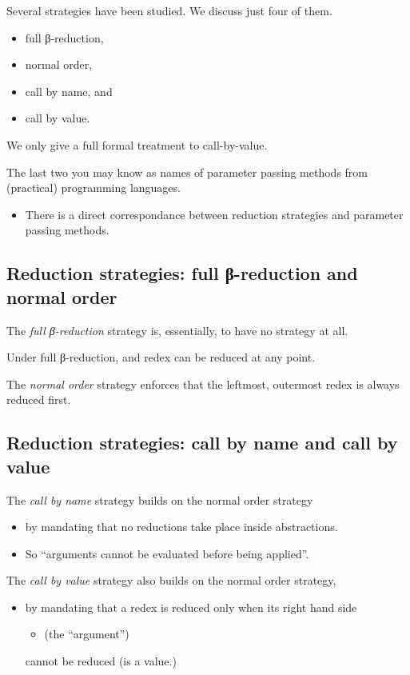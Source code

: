 \documentclass[11pt]{article}
\theoremstyle{definition}
\begin{document}
Several strategies have been studied. We discuss just four of them.
\begin{itemize}
\item full β-reduction,
\item normal order,
\item call by name, and
\item call by value.
\end{itemize}
We only give a full formal treatment to call-by-value.

The last two you may know as names of parameter passing methods
from (practical) programming languages.
\begin{itemize}
\item There is a direct correspondance between reduction strategies
and parameter passing methods.
\end{itemize}

\subsection{Reduction strategies: full β-reduction and normal order}
\label{sec:orga435b41}
The \emph{full β-reduction} strategy is, essentially, to have no
strategy at all.

Under full β-reduction, and redex can be reduced at any point.

The \emph{normal order} strategy enforces that the
leftmost, outermost redex is always reduced first.

\subsection{Reduction strategies: call by name and call by value}
\label{sec:orgf76a00f}
The \emph{call by name} strategy builds on the normal order strategy
\begin{itemize}
\item by mandating that no reductions take place inside abstractions.
\item So “arguments cannot be evaluated before being applied”.
\end{itemize}

The \emph{call by value} strategy also builds on the normal order strategy,
\begin{itemize}
\item by mandating that a redex is reduced only when its right hand side
\begin{itemize}
\item (the “argument”)
\end{itemize}
cannot be reduced (is a value.)
\end{itemize}
\end{document}
